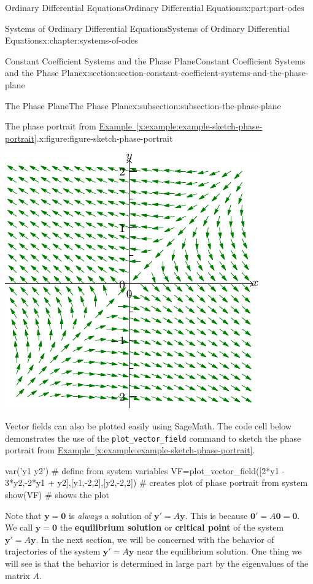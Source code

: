 \documentclass[twoside,10pt,]{book}
\newcommand{\xreffont}{\relax}
\newcommand{\mono}[1]{\texttt{#1}}
\newcommand{\terminology}[1]{\textbf{#1}}
\numberwithin{equation}{part}
\renewcommand{\vec}[1]{\mathbf{#1}}
\begin{document}
\begin{partptx}{Ordinary Differential Equations}{}{Ordinary Differential Equations}{}{}{x:part:part-odes}
\begin{chapterptx}{Systems of Ordinary Differential Equations}{}{Systems of Ordinary Differential Equations}{}{}{x:chapter:systems-of-odes}
\begin{sectionptx}{Constant Coefficient Systems and the Phase Plane}{}{Constant Coefficient Systems and the Phase Plane}{}{}{x:section:section-constant-coefficient-systems-and-the-phase-plane}
\begin{subsectionptx}{The Phase Plane}{}{The Phase Plane}{}{}{x:subsection:subsection-the-phase-plane}
\begin{figureptx}{The phase portrait from \hyperref[x:example:example-sketch-phase-portrait]{Example~{\xreffont\ref{x:example:example-sketch-phase-portrait}}}.}{x:figure:figure-sketch-phase-portrait}{}
\begin{image}{0.25}{0.5}{0.25}
\includegraphics[width=\linewidth]{generated/asymptote/image-15.pdf}
\end{image}%
\tcblower
\end{figureptx}%
Vector fields can also be plotted easily using SageMath. The code cell below demonstrates the use of the \mono{plot\_vector\_field} command to sketch the phase portrait from \hyperref[x:example:example-sketch-phase-portrait]{Example~{\xreffont\ref{x:example:example-sketch-phase-portrait}}}.%
\begin{sageinput}
var('y1 y2') # define from system variables
VF=plot_vector_field([2*y1 - 3*y2,-2*y1 + y2],[y1,-2,2],[y2,-2,2]) # creates plot of phase portrait from system
show(VF) # shows the plot
\end{sageinput}
Note that \(\vec{y}=\vec{0}\) is \emph{always} a solution of \(\vec{y}'=A\vec{y}\). This is because \(\vec{0}'=A\vec{0} = \vec{0}\). We call \(\vec{y} = \vec{0}\) the \terminology{equilibrium solution} or \terminology{critical point} of the system \(\vec{y}'=A\vec{y}\). In the next section, we will be concerned with the behavior of trajectories of the system \(\vec{y}'=A\vec{y}\) near the equilibrium solution. One thing we will see is that the behavior is determined in large part by the eigenvalues of the matrix \(A\).%

\end{subsectionptx}
\end{sectionptx}
\end{chapterptx}
\end{partptx}
\end{document}

